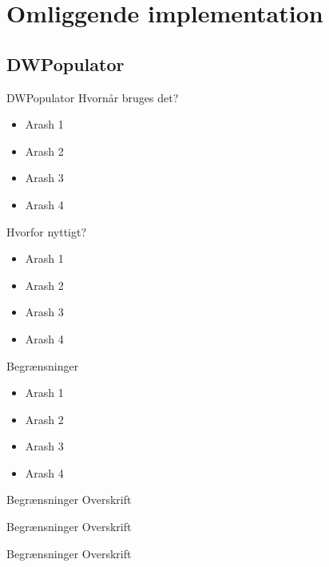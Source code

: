 \section{Omliggende implementation}

\subsection{DWPopulator}
\begin{frame}{DWPopulator}{}
  Hvornår bruges det?
  \begin{itemize}
    \item<1-> Arash 1
    \item<2-> Arash 2
    \item<3-> Arash 3
    \item<4-> Arash 4
  \end{itemize}
  Hvorfor nyttigt?
  \begin{itemize}
    \item<5-> Arash 1
    \item<6-> Arash 2
    \item<7-> Arash 3
    \item<8-> Arash 4
  \end{itemize}
\end{frame}

\begin{frame}{Begrænsninger}{}
  \begin{itemize}
    \item<1-> Arash 1
    \item<2-> Arash 2
    \item<3-> Arash 3
    \item<4-> Arash 4
  \end{itemize}
\end{frame}

\begin{frame}{Begrænsninger}{}
  Overskrift
\end{frame}

\begin{frame}{Begrænsninger}{}
  Overskrift
\end{frame}

\begin{frame}{Begrænsninger}{}
  Overskrift
\end{frame}

